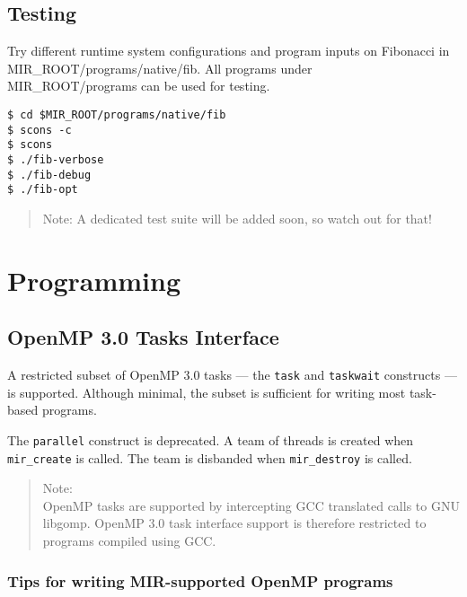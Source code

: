 \documentclass[11pt,a4paper]{article}
\begin{document}
\subsection{Testing}\label{testing}

Try different runtime system configurations and program inputs on Fibonacci in MIR\_ROOT/programs/native/fib. All programs under \\ MIR\_ROOT/programs can be used for testing.

\begin{lstlisting}[style=MyInputStyle]
$ cd $MIR_ROOT/programs/native/fib
$ scons -c
$ scons
$ ./fib-verbose
$ ./fib-debug
$ ./fib-opt
\end{lstlisting}

\begin{framed}
\begin{quote}
Note: A dedicated test suite will be added soon, so watch out for that!
\end{quote}
\end{framed}

\section{Programming}\label{programming}

\subsection{OpenMP 3.0 Tasks Interface}\label{openmp-3.0-tasks-interface}

A restricted subset of OpenMP 3.0 tasks --- the \lstinline!task! and \lstinline!taskwait! constructs --- is supported. Although minimal, the subset is sufficient for writing most task-based programs.  

The \lstinline!parallel! construct is deprecated. A team of threads is created when \lstinline!mir_create! is called. The team is disbanded when \lstinline!mir_destroy! is called.

\begin{framed}
\begin{quote}
Note:\\OpenMP tasks are supported by intercepting GCC translated calls to GNU libgomp. OpenMP 3.0 task interface support is therefore restricted to programs compiled using GCC.
\end{quote}
\end{framed}

\subsubsection{Tips for writing MIR-supported OpenMP programs}\label{tips-for-writing-mir-supported-openmp-programs}
\end{document}
